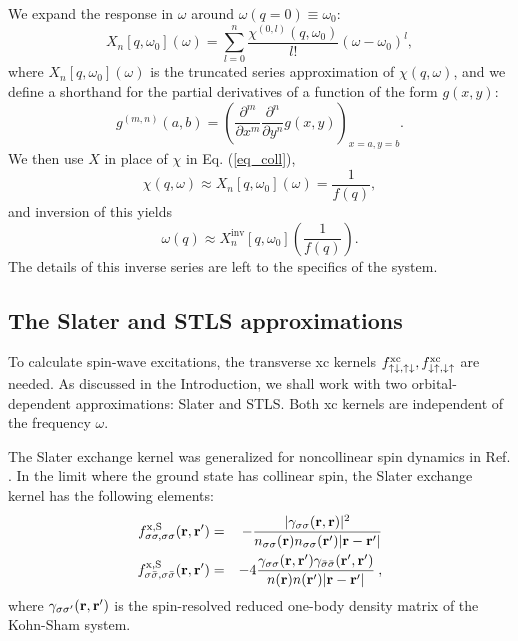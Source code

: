 \documentclass[aps,prb,twocolumn,superscriptaddress]{revtex4-2}
\newcommand{\bfr}{{\bf r}}
\newcommand{\w}{\omega}
\newcommand{\ua}{\uparrow}
\newcommand{\da}{\downarrow}
\begin{document}
We expand the response in $\w$ around $\omega(q=0)\equiv \w_0$:
\begin{equation}
  X_n[q,\w_0](\w) = \sum_{l=0}^n \frac{\chi^{(0,l)}(q,\w_0)}{l!}  (\w-\w_0)^l,
\end{equation}
where $X_n[q,\w_0](\w)$ is the truncated series approximation of $\chi(q,\w)$, and we define a shorthand for the partial derivatives of a function of the form $g(x,y)$:
\begin{equation}
  g^{(m,n)} (a,b) = \left( \frac{\partial^m}{\partial x^m}\frac{\partial^n}{\partial y^n} g(x,y) \right)_{x=a,y=b}.
\end{equation}
We then use $X$ in place of $\chi$ in  Eq. (\ref{eq_coll}),
\begin{equation}
  \chi(q,\w) \approx X_n [q,\w_0](\w)=\frac{1}{f(q)} ,
\end{equation}
and inversion of this yields
\begin{equation}
  \w(q) \approx X_n^{\text{inv}}[q,\w_0]\left(\frac{1}{f(q)}\right).
\end{equation}
The details of this inverse series are left to the specifics of the system.

\subsection{The Slater and STLS approximations}\label{sec2C}

To calculate spin-wave excitations, the transverse xc kernels $f^{\rm xc}_{\ua\da,\ua\da},f^{\rm xc}_{\da\ua,\da\ua}$ are needed.
As discussed in the Introduction, we shall work with two orbital-dependent approximations:
Slater and STLS. Both xc kernels are independent of the frequency $\omega$.

The Slater exchange kernel \cite{Petersilka1996,GiulianiVignale} was generalized
for noncollinear spin dynamics in Ref. \cite{Ullrich2018}. In the limit where the ground state has collinear spin, the Slater exchange kernel has the following elements:
\begin{eqnarray}\label{eq:Slater1}
f^{\rm x,S}_{\sigma\sigma,\sigma\sigma}(\bfr,\bfr') &=& -\frac{|\gamma_{\sigma\sigma}(\bfr,\bfr)|^2}{n_{\sigma\sigma}(\bfr)n_{\sigma\sigma}(\bfr')|\bfr - \bfr'|}
\\
f^{\rm x,S}_{\sigma\bar\sigma,\sigma\bar\sigma}(\bfr,\bfr') &=& -4\frac{\gamma_{\sigma\sigma}(\bfr,\bfr')\gamma_{\bar\sigma\bar\sigma}(\bfr',\bfr')}{n(\bfr)n(\bfr')|\bfr - \bfr'|} \:,
\label{eq:Slater2}
\end{eqnarray}
where $\gamma_{\sigma\sigma'}(\bfr,\bfr')$ is the spin-resolved reduced one-body density matrix of the Kohn-Sham system.
\end{document}
